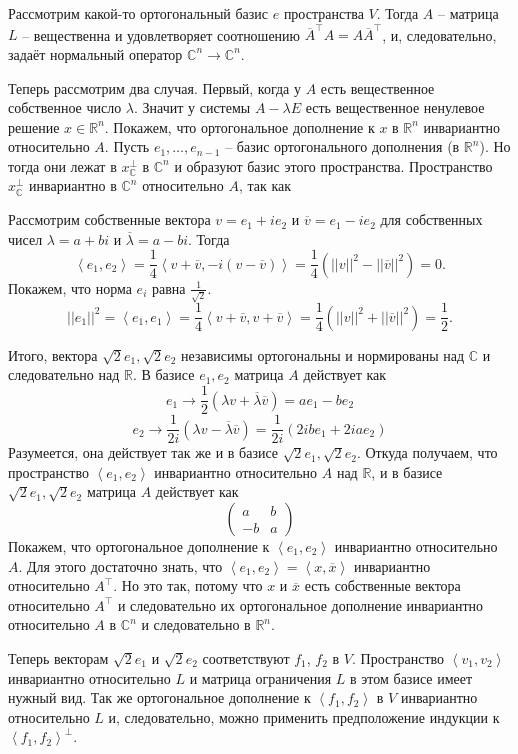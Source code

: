 \documentclass[10pt,a4paper,oneside]{book} %
\theoremstyle{definition}
\newcommand{\mb}[1]{\mathbb{#1}}
\newcommand{\ovl}{\overline}
\def\lan{\left\langle }
\def\ran{\right\rangle}
\begin{document}
Рассмотрим какой-то ортогональный базис $e$ пространства $V$. Тогда $A$ -- матрица $L$ -- вещественна и удовлетворяет соотношению $\ovl{A}^{\top}A=A\ovl{A}^{\top}$, и, следовательно, задаёт нормальный оператор $\mb C^n \to \mb C^n$.

Теперь рассмотрим два случая. Первый, когда у $A$ есть вещественное собственное число $\lambda$. Значит у системы $A-\lambda E$ есть вещественное ненулевое решение $x\in \mb R^n$. Покажем, что ортогональное дополнение к $x$ в $\mb R^n$ инвариантно относительно $A$. Пусть $e_1,\dots,e_{n-1} $ -- базис ортогонального дополнения (в $\mb R^n$). Но тогда они лежат в $x^{\bot}_{\mb C}$ в $\mb C^n$ и образуют базис этого пространства. Пространство $x^{\bot}_{\mb C}$ инвариантно в $\mb C^n$ относительно $A$, так как  


Рассмотрим собственные вектора $v=e_1 + i e_2 $ и $\ovl{v}=e_1-ie_2$ для собственных чисел $\lambda= a+bi$ и $\ovl{\lambda}=a-bi$. Тогда
$$\lan e_1, e_2\ran = \frac{1}{4} \lan v+\ovl{v}, -i( v-\ovl{v})\ran= \frac{1}{4}(||v||^2-||\ovl{v}||^2)=0.$$
Покажем, что норма $e_i$ равна $\frac{1}{\sqrt{2}}$.
$$||e_1||^2=\lan e_1, e_1\ran = \frac{1}{4} \lan v+\ovl{v},  v+\ovl{v}\ran= \frac{1}{4}(||v||^2+||\ovl{v}||^2)=\frac{1}{2}.$$

Итого, вектора $\sqrt{2}e_1,\sqrt{2}e_2$ независимы ортогональны и нормированы над $\mb C$ и следовательно над $\mb R$. В базисе $e_1,e_2$ матрица $A$ действует как 
$$e_1 \to \frac{1}{2}(\lambda v + \ovl{\lambda}\ovl{v})=ae_1 - be_2 $$
$$e_2 \to \frac{1}{2i}(\lambda v - \ovl{\lambda}\ovl{v})=\frac{1}{2i}( 2i b e_1 + 2i  a e_2) $$
Разумеется, она действует так же и в базисе $\sqrt{2}e_1,\sqrt{2}e_2$. Откуда получаем, что пространство $\lan e_1,e_2\ran $ инвариантно относительно $A$ над $\mb R$, и в базисе $\sqrt{2}e_1,\sqrt{2}e_2$ матрица $A$  действует как  
$$\begin{pmatrix}
a & b\\
-b & a
\end{pmatrix}$$
Покажем, что ортогональное дополнение к $\lan e_1, e_2 \ran$ инвариантно относительно $A$. Для этого достаточно знать, что $\lan e_1, e_2\ran = \lan x, \ovl{x} \ran $ инвариантно относительно $A^{\top}$. Но это так, потому что $x$ и $\ovl{x}$ есть собственные вектора  относительно $A^{\top}$ и следовательно их ортогональное дополнение инвариантно относительно $A$ в $\mb C^n$ и следовательно в $\mb R^n$.

Теперь векторам $\sqrt{2}e_1$ и $\sqrt{2}e_2$ соответствуют $f_1$, $f_2$ в $V$. Пространство $\lan v_1,v_2 \ran$ инвариантно относительно $L$ и матрица ограничения $L$ в этом базисе имеет нужный вид. Так же ортогональное дополнение к $\lan f_1,f_2\ran$ в $V$ инвариантно относительно $L$ и, следовательно, можно применить предположение индукции к $\lan f_1,f_2\ran^{\bot}$. 
\endproof
\end{document}
